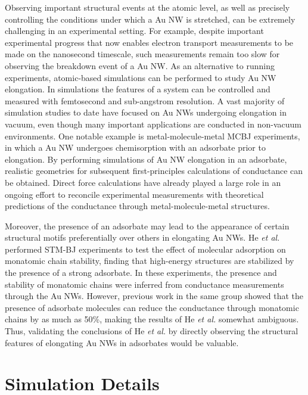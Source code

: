 \documentclass[10pt]{report}  %
\begin{document}
Observing important structural events at the atomic level, as well as precisely controlling the conditions under which a Au NW is stretched, can be extremely challenging in an experimental setting.  For example, despite important experimental progress that now enables electron transport measurements to be made on the nanosecond timescale,\cite{Guo:2011} such measurements remain too slow for observing the breakdown event of a Au NW.  As an alternative to running experiments, atomic-based simulations can be performed to study Au NW elongation.  In simulations the features of a system can be controlled and measured with femtosecond and sub-angstrom resolution.  A vast majority of simulation studies to date have focused on Au NWs undergoing elongation in vacuum, \cite{Coura:2004,Pu:2008,Pu_JCP:2007,Sato:2005,Lin:2005,Wang:2007,Koh:2006,Wang:2001,Wen:2010} even though many important applications are conducted in non-vacuum environments.  One notable example is metal-molecule-metal MCBJ experiments, \cite{Reed:1997,Wu:2008,Tsutsui_apl:2008,Tsutsui_nl:2009,Schneebeli:2011} in which a Au NW undergoes chemisorption with an adsorbate prior to elongation.  By performing simulations of Au NW elongation in an adsorbate, realistic geometries for subsequent first-principles calculations of conductance can be obtained.  Direct force calculations have already played a large role in an ongoing effort to reconcile experimental measurements with theoretical predictions of the conductance through metal-molecule-metal structures. \cite{Andrews:2008,Paulsson:2009,Strange:2010,Velez:2010,Kim:2010,Sergueev:2010}

Moreover, the presence of an adsorbate may lead to the appearance of certain structural motifs preferentially over others in elongating Au NWs.  He \emph{et al.} \cite{He:2002} performed STM-BJ experiments to test the effect of molecular adsorption on monatomic chain stability, finding that high-energy structures are stabilized by the presence of a strong adsorbate.  In these experiments, the presence and stability of monatomic chains were inferred from conductance measurements through the Au NWs.  However, previous work in the same group showed that the presence of adsorbate molecules can reduce the conductance through monatomic chains by as much as 50\%, \cite{Bogozi:2001} making the results of He \emph{et al.} somewhat ambiguous.  Thus, validating the conclusions of He \emph{et al.} by directly observing the structural features of elongating Au NWs in adsorbates would be valuable.

\section{Simulation Details}
\end{document}
